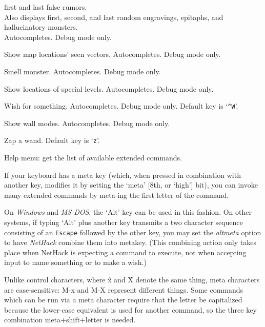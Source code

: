 first and last false rumors.\\
Also displays first, second, and last random engravings, epitaphs,
and hallucinatory monsters.\\
Autocompletes.
Debug mode only.
\item[\tb{\#wizseenv}]
Show map locations' seen vectors.
Autocompletes.
Debug mode only.
\item[\tb{\#wizsmell}]
Smell monster.
Autocompletes.
Debug mode only.
\item[\tb{\#wizwhere}]
Show locations of special levels.
Autocompletes.
Debug mode only.
\item[\tb{\#wizwish}]
Wish for something.
Autocompletes.
Debug mode only.
Default key is `{\tt \^{}W}'.
\item[\tb{\#wmode}]
Show wall modes.
Autocompletes.
Debug mode only.
\item[\tb{\#zap}]
Zap a wand. Default key is `{\tt z}'.
\item[\tb{\#?}]
Help menu:  get the list of available extended commands.
\elist

\nd If your keyboard has a meta key (which, when pressed in combination
with another key, modifies it by setting the `meta' [8th, or `high']
bit), you can invoke many extended commands by meta-ing the first
letter of the command.

On {\it Windows\/} and {\it MS-DOS\/},
the `Alt' key can be used in this fashion.
On other systems, if typing `Alt' plus another key transmits a
two character sequence consisting of an {\tt Escape}
followed by the other key, you may set the {\it altmeta\/}
option to have {\it NetHack\/} combine them into meta\+key.
(This combining action only takes place when NetHack is expecting a
command to execute, not when accepting input to name something or to
make a wish.)

Unlike control characters, where \^x and \^X denote the same thing,
meta characters are case-sensitive:  M-x and M-X represent different things.
Some commands which can be run via a meta character require that the
letter be capitalized because the lower-case equivalent is used for
another command, so the three key combination meta+shift+letter is needed.

